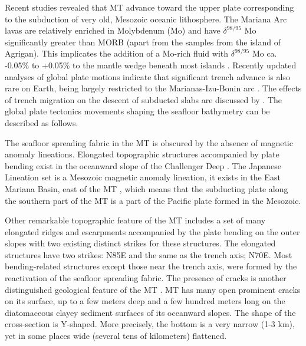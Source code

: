 \documentclass[11pt,a4paper]{report}
\begin{document}
Recent studies revealed \cite{Faccennaetal2009} that \ac{MT} advance toward the upper plate corresponding to the subduction of very old, Mesozoic oceanic lithosphere. The Mariana Arc lavas are relatively enriched in Molybdenum (Mo) and have $\delta^{98/95}$ Mo significantly greater than \ac{MORB} (apart from the samples from the island of Agrigan). This implicates the addition of a Mo-rich fluid with $\delta^{98/95}$ Mo ca. -0.05\% to +0.05\% to the mantle wedge beneath most islands \cite{Freymuthetal2015}. Recently updated analyses of global plate motions indicate that significant trench advance is also rare on Earth, being largely restricted to the Marianas-Izu-Bonin arc \cite{CizkovaBina2015}. The effects of trench migration on the descent of subducted slabs are discussed by \cite{Griffithsetal1995}. The global plate tectonics movements shaping the seafloor bathymetry can be described as follows. 

The seafloor spreading fabric in the \ac{MT} is obscured by the absence of magnetic anomaly lineations. Elongated topographic structures accompanied by plate bending exist in the oceanward slope of the Challenger Deep \cite{Zhangetal2014}. The Japanese Lineation set is a Mesozoic magnetic anomaly lineation, it exists in the East Mariana Basin, east of the \ac{MT} \cite{Nakanishietal1992}, which means that the subducting plate along the southern part of the \ac{MT} is a part of the Pacific plate formed in the Mesozoic. 

Other remarkable topographic feature of the \ac{MT} includes a set of many elongated ridges and escarpments accompanied by the plate bending on the outer slopes with two existing distinct strikes for these structures. The elongated structures have two strikes: N85\degree E and the same as the trench axis; N70\degree\space E. Most bending-related structures except those near the trench axis, were formed by the reactivation of the seafloor spreading fabric. The presence of cracks is another distinguished geological feature of the \ac{MT} \cite{Ogawaetal1997}. \ac{MT} has many open prominent cracks on its surface, up to a few meters deep and a few hundred meters long on the diatomaceous clayey sediment surfaces of its oceanward slopes. The shape of the cross-section is Y-shaped. More precisely, the bottom is a very narrow (1-3 km), yet in some places wide (several tens of kilometers) flattened.
\end{document}
